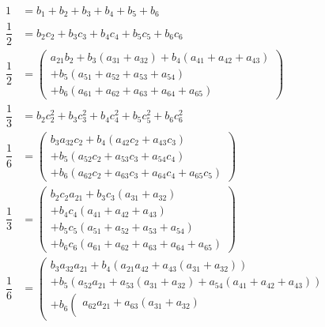 \documentclass[a4paper,oneside]{book}
\numberwithin{equation}{chapter}
\begin{document}
\begin{align}
1 &= {b_1} + {b_2} + {b_3} + {b_4} + {b_5} + {b_6}\\
\dfrac{1}{2} &= {b_2}{c_2} + {b_3}{c_3} + {b_4}{c_4} + {b_5}{c_5} + {b_6}{c_6}\\
\dfrac{1}{2} &= \left( \begin{array}{l}
{a_{21}}{b_2} + {b_3}\left( {{a_{31}} + {a_{32}}} \right) + {b_4}\left( {{a_{41}} + {a_{42}} + {a_{43}}} \right)\\
 + {b_5}\left( {{a_{51}} + {a_{52}} + {a_{53}} + {a_{54}}} \right)\\
 + {b_6}\left( {{a_{61}} + {a_{62}} + {a_{63}} + {a_{64}} + {a_{65}}} \right)
\end{array} \right)\\
\dfrac{1}{3} &= {b_2}c_2^2 + {b_3}c_3^2 + {b_4}c_4^2 + {b_5}c_5^2 + {b_6}c_6^2\\
\dfrac{1}{6} &= \left( \begin{array}{l}
{b_3}{a_{32}}{c_2} + {b_4}\left( {{a_{42}}{c_2} + {a_{43}}{c_3}} \right)\\
 + {b_5}\left( {{a_{52}}{c_2} + {a_{53}}{c_3} + {a_{54}}{c_4}} \right)\\
 + {b_6}\left( {{a_{62}}{c_2} + {a_{63}}{c_3} + {a_{64}}{c_4} + {a_{65}}{c_5}} \right)
\end{array} \right)\\
\dfrac{1}{3} &= \left( \begin{array}{l}
{b_2}{c_2}{a_{21}} + {b_3}{c_3}\left( {{a_{31}} + {a_{32}}} \right)\\
 + {b_4}{c_4}\left( {{a_{41}} + {a_{42}} + {a_{43}}} \right)\\
 + {b_5}{c_5}\left( {{a_{51}} + {a_{52}} + {a_{53}} + {a_{54}}} \right)\\
 + {b_6}{c_6}\left( {{a_{61}} + {a_{62}} + {a_{63}} + {a_{64}} + {a_{65}}} \right)
\end{array} \right)\\
\dfrac{1}{6} &= \left( \begin{array}{l}
{b_3}{a_{32}}{a_{21}} + {b_4}\left( {{a_{21}}{a_{42}} + {a_{43}}\left( {{a_{31}} + {a_{32}}} \right)} \right)\\
 + {b_5}\left( {{a_{52}}{a_{21}} + {a_{53}}\left( {{a_{31}} + {a_{32}}} \right) + {a_{54}}\left( {{a_{41}} + {a_{42}} + {a_{43}}} \right)} \right)\\
 + {b_6}\left( \begin{array}{l}
{a_{62}}{a_{21}} + {a_{63}}\left( {{a_{31}} + {a_{32}}} \right)\\

\end{array}
\end{array}
\end{align}
\end{document}
